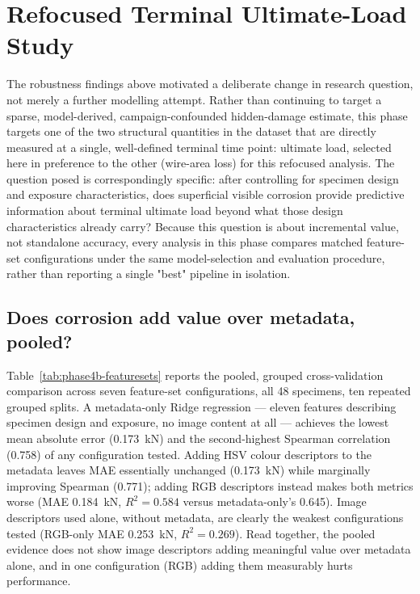 \section{Refocused Terminal Ultimate-Load Study}
\label{sec:phase4b}

The robustness findings above motivated a deliberate change in research
question, not merely a further modelling attempt. Rather than continuing to
target a sparse, model-derived, campaign-confounded hidden-damage estimate,
this phase targets one of the two structural quantities in the dataset
that are directly measured at a single, well-defined terminal time point:
ultimate load, selected here in preference to the other (wire-area loss)
for this refocused analysis. The question posed is correspondingly
specific: after controlling for
specimen design and exposure characteristics, does superficial visible
corrosion provide predictive information about terminal ultimate load
beyond what those design characteristics already carry? Because this
question is about incremental value, not standalone accuracy, every
analysis in this phase compares matched feature-set configurations under
the same model-selection and evaluation procedure, rather than reporting a
single "best" pipeline in isolation.

\subsection{Does corrosion add value over metadata, pooled?}

Table~\ref{tab:phase4b-featuresets} reports the pooled, grouped
cross-validation comparison across seven feature-set configurations, all 48
specimens, ten repeated grouped splits. A metadata-only Ridge regression —
eleven features describing specimen design and exposure, no image content
at all — achieves the lowest mean absolute error (0.173~kN) and the
second-highest Spearman correlation (0.758) of any configuration tested.
Adding HSV colour descriptors to the metadata leaves MAE essentially
unchanged (0.173~kN) while marginally improving Spearman (0.771); adding
RGB descriptors instead makes both metrics worse (MAE 0.184~kN, $R^2=0.584$
versus metadata-only's 0.645). Image descriptors used alone, without
metadata, are clearly the weakest configurations tested (RGB-only MAE
0.253~kN, $R^2=0.269$). Read together, the pooled evidence does not show
image descriptors adding meaningful value over metadata alone, and in one
configuration (RGB) adding them measurably hurts performance.

